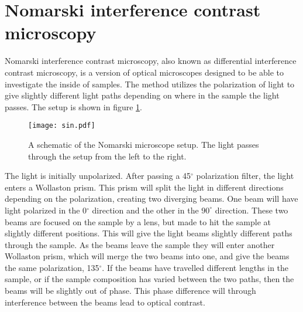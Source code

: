 
	
\section{Nomarski interference contrast microscopy}
\label{sec:nomarski}

Nomarski interference contrast microscopy, also known as differential interference contrast microscopy, is a version of optical microscopes designed to be able to investigate the inside of samples. The method utilizes the polarization of light to give slightly different light paths depending on where in the sample the light passes. The setup is shown in figure \ref{fig:nomarski}.

\begin{figure}[h]
\begin{center}
\texttt{[image: sin.pdf]}
\caption{A schematic of the Nomarski microscope setup. The light passes through the setup from the left to the right. 
\label{fig:nomarski}}
\end{center}
\end{figure}

The light is initially unpolarized. After passing a 45$^\circ$ polarization filter, the light enters a Wollaston prism. This prism will split the light in different directions depending on the polarization, creating two diverging beams. One beam will have light polarized in the 0$^\circ$ direction and the other in the $90^\circ$ direction. These two beams are focused on the sample by a lens, but made to hit the sample at slightly different positions. This will give the light beams slightly different paths through the sample. As the beams leave the sample they will enter another Wollaston prism, which will merge the two beams into one, and give the beams the same polarization, 135$^\circ$. If the beams have travelled different lengths in the sample, or if the sample composition has varied between the two paths, then the beams will be slightly out of phase. This phase difference will through interference between the beams lead to optical contrast.

